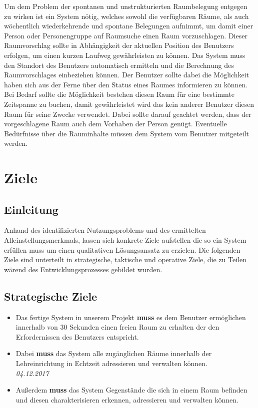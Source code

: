Um dem Problem der spontanen und unstrukturierten Raumbelegung entgegen zu
wirken ist ein System nötig, welches sowohl die verfügbaren Räume, als auch
wöchentlich wiederkehrende und spontane Belegungen aufnimmt, um damit einer
Person oder Personengruppe auf Raumsuche einen Raum vorzuschlagen. Dieser
Raumvorschlag sollte in Abhängigkeit der aktuellen Position des Benutzers
erfolgen, um einen kurzen Laufweg gewährleisten zu können. Das System muss den
Standort des Benutzers automatisch ermitteln und die Berechnung des
Raumvorschlages einbeziehen können. 
Der Benutzer sollte dabei die Möglichkeit haben sich aus der Ferne über den
Status eines Raumes informieren zu können.
Bei Bedarf sollte die Möglichkeit bestehen diesen Raum für eine bestimmte
Zeitspanne zu buchen, damit gewährleistet wird das kein anderer Benutzer diesen
Raum für seine Zwecke verwendet.
Dabei sollte darauf geachtet werden, dass der vorgeschlagene Raum auch dem
Vorhaben der Person genügt. Eventuelle Bedürfnisse über die Rauminhalte müssen
dem System vom Benutzer mitgeteilt werden.


\section{Ziele}
\label{sec:Ziele}

\subsection{Einleitung}
\label{sec:Ziele_Einleitung}

Anhand des identifizierten Nutzungsproblems und des ermittelten
Alleinstellungsmerkmals, lassen sich konkrete Ziele aufstellen die so ein
System  erfüllen muss um einen qualitativen Lösungsansatz zu erzielen.   
Die folgenden Ziele sind unterteilt in strategische, taktische und operative
Ziele, die zu Teilen wärend des Entwicklungsprozesses gebildet wurden.

\subsection{Strategische Ziele}
\label{sec:Strategische Ziele}

\begin{itemize}
	\item Das fertige System in unserem Projekt \textbf{muss} es dem Benutzer
	ermöglichen innerhalb von 30 Sekunden einen freien Raum zu erhalten der
	den Erfordernissen des Benutzers entspricht.
	\item Dabei \textbf{muss} das System alle zugänglichen Räume innerhalb
	der Lehreinrichtung in Echtzeit adressieren und verwalten können.\\
	\textit{04.12.2017}\\
	\item Außerdem \textbf{muss} das System Gegenstände die sich in einem Raum
	befinden und diesen charakterisieren erkennen, adressieren und verwalten
	können.
\end{itemize}

